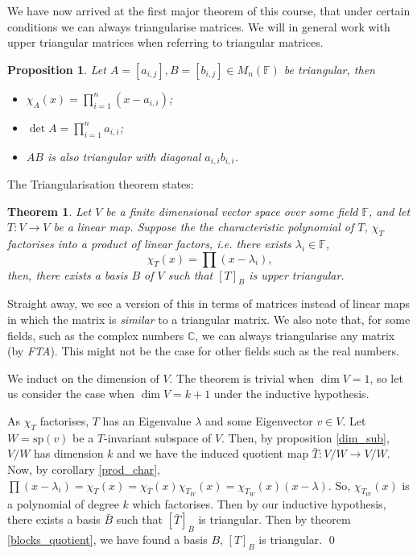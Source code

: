 \documentclass[
]{article}
\newtheorem{theorem}{Theorem}
\newtheorem{prop}{Proposition}[section]
\theoremstyle{definition}
\begin{document}
We have now arrived at the first major theorem of this course, that
under certain conditions we can always triangularise matrices. We will
in general work with upper triangular matrices when referring to
triangular matrices.

\begin{prop}
  Let \(A = [a_{i, j}], B = [b_{i, j}] \in M_n(\mathbb{F})\) be triangular, then 
  \begin{itemize}
    \item \(\chi_A(x) = \prod_{i = 1}^n (x - a_{i, i})\);
    \item \(\det A = \prod_{i = 1}^n a_{i, i}\);
    \item \(AB\) is also triangular with diagonal \(a_{i, i}b_{i, i}\).
  \end{itemize}
\end{prop}

The Triangularisation theorem states:

\begin{theorem}
  Let \(V\) be a finite dimensional vector space over some field \(\mathbb{F}\), 
  and let \(T : V \to V\) be a linear map. Suppose the the characteristic 
  polynomial of \(T\), \(\chi_T\) factorises into a product of linear factors, 
  i.e. there exists \(\lambda_i \in \mathbb{F}\), 
  \[\chi_T(x) = \prod (x - \lambda_i),\]
  then, there exists a basis \(B\) of \(V\) such that \([T]_B\) is upper 
  triangular.
\end{theorem}

Straight away, we see a version of this in terms of matrices instead of
linear maps in which the matrix is \emph{similar} to a triangular
matrix. We also note that, for some fields, such as the complex numbers
\(\mathbb{C}\), we can always triangularise any matrix (by \emph{FTA}).
This might not be the case for other fields such as the real numbers.

\proof

We induct on the dimension of \(V\). The theorem is trivial when
\(\dim V = 1\), so let us consider the case when \(\dim V = k + 1\)
under the inductive hypothesis.

As \(\chi_T\) factorises, \(T\) has an Eigenvalue \(\lambda\) and some
Eigenvector \(v \in V\). Let \(W = \text{sp}(v)\) be a \(T\)-invariant
subspace of \(V\). Then, by proposition \ref{dim_sub}, \(V / W\) has
dimension \(k\) and we have the induced quotient map
\(\bar{T} : V / W \to V / W\). Now, by corollary \ref{prod_char},
\(\prod (x - \lambda_i) = \chi_T(x) =  \chi_{\bar{T}}(x) \chi_{T_W}(x) = \chi_{T_W}(x)(x - \lambda)\).
So, \(\chi_{T_W}(x)\) is a polynomial of degree \(k\) which factorises.
Then by our inductive hypothesis, there exists a basis \(\bar{B}\) such
that \([\bar{T}]_{\bar{B}}\) is triangular. Then by theorem
\ref{blocks_quotient}, we have found a basis \(B\), \([T]_B\) is
triangular. \qed
\end{document}
